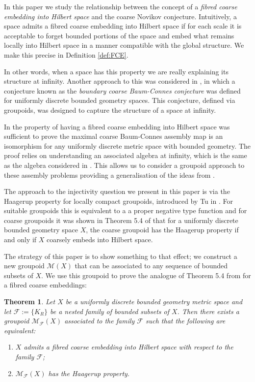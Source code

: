 \documentclass[11pt]{amsart}
\theoremstyle{plain}
\newtheorem{theorem}{Theorem}%
\theoremstyle{definition}%
\theoremstyle{remark}%
\begin{document}
In this paper we study the relationship between the concept of a \textit{fibred coarse embedding into Hilbert space} and the coarse Novikov conjecture. Intuitively, a space admits a fibred coarse embedding into Hilbert space if for each scale it is acceptable to forget bounded portions of the space and embed what remains locally into Hilbert space in a manner compatible with the global structure. We make this precise in Definition \ref{def:FCE}.

In other words, when a space has this property we are really explaining its structure at infinity. Another approach to this was considered in \cite{mypub1}, in which a conjecture known as the \textit{boundary coarse Baum-Connes conjecture} was defined for uniformly discrete bounded geometry spaces. This conjecture, defined via groupoids, was designed to capture the structure of a space at infinity. 

In \cite{FCEpaper} the property of having a fibred coarse embedding into Hilbert space was sufficient to prove the maximal coarse Baum-Connes assembly map is an isomorphism for any uniformly discrete metric space with bounded geometry. The proof relies on understanding an associated algebra at infinity, which is the same as the algebra considered in \cite{mypub1}. This allows us to consider a groupoid approach to these assembly problems providing a generalisation of the ideas from \cite{MR1905840}.

The approach to the injectivity question we present in this paper is via the Haagerup property for locally compact groupoids, introduced by Tu in \cite{MR1703305}. For suitable groupoids this is equivalent to a a proper negative type function and for coarse groupoids it was shown in Theorem 5.4 of \cite{MR1905840} that for a uniformly discrete bounded geometry space $X$, the coarse groupoid has the Haagerup property if and only if $X$ coarsely embeds into Hilbert space. 

The strategy of this paper is to show something to that effect; we construct a new groupoid $\mathcal{M}(X)$ that can be associated to any sequence of bounded subsets of $X$. We use this groupoid to prove the analogue of Theorem 5.4 from \cite{MR1905840} for a fibred coarse embeddings: 

\begin{theorem}\label{Thm:MR1}
Let $X$ be a uniformly discrete bounded geometry metric space and let $\mathcal{F}:=\lbrace K_{R} \rbrace$ be a nested family of bounded subsets of $X$. Then there exists a groupoid $\mathcal{M}_{\mathcal{F}}(X)$ associated to the family $\mathcal{F}$ such that the following are equivalent:
\begin{enumerate}
\item $X$ admits a fibred coarse embedding into Hilbert space with respect to the family $\mathcal{F}$;
\item$\mathcal{M}_{\mathcal{F}}(X)$ has the Haagerup property.
\end{enumerate}
\end{theorem}
\end{document}
